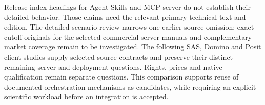 Release-index headings for Agent Skills and MCP server do not establish their
detailed behavior. Those claims need the relevant primary technical text and
edition. The detailed scenario review narrows one earlier source omission;
exact cutoff originals for the selected commercial server manuals and complementary market coverage remain to be investigated. The following SAS, Domino and Posit client studies supply selected source contracts and preserve their distinct remaining server and deployment questions. Rights,
prices and native qualification remain separate questions. This comparison
supports reuse of documented orchestration mechanisms as candidates, while
requiring an explicit scientific workload before an integration is accepted.
